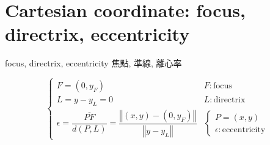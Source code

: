 \documentclass[
]{book}
\theoremstyle{definition}
\theoremstyle{definition}
\theoremstyle{definition}
\theoremstyle{definition}
\theoremstyle{remark}
\begin{document}
\hypertarget{cartesian-coordinate-focus-directrix-eccentricity}{%
\section{Cartesian coordinate: focus, directrix, eccentricity}\label{cartesian-coordinate-focus-directrix-eccentricity}}

\begin{CJK}{UTF8}{bsmi}
focus, directrix, eccentricity 焦點, 準線, 離心率
\end{CJK}

\[
\begin{cases}
F=\left(0,y_{{\scriptscriptstyle F}}\right) & F:\text{focus}\\
L=y-y_{{\scriptscriptstyle L}}=0 & L:\text{directrix}\\
\epsilon=\dfrac{\overline{PF}}{d\left(P,L\right)}=\dfrac{\left\Vert \left(x,y\right)-\left(0,y_{{\scriptscriptstyle F}}\right)\right\Vert }{\left\Vert y-y_{{\scriptscriptstyle L}}\right\Vert } & \begin{cases}
P=\left(x,y\right)\\
\epsilon:\text{eccentricity}
\end{cases}
\end{cases}
\]
\end{document}
